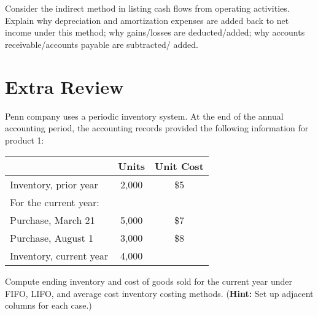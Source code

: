 \documentclass{scrartcl}
\begin{document}
\vspace{10em}

Consider the indirect method in listing cash flows from operating
activities. Explain why depreciation and amortization expenses are 
added back to net income under this method; why gains/losses are
deducted/added; why accounts receivable/accounts payable are subtracted/%
added.

\vspace{10em}

\section{Extra Review}

Penn company uses a periodic inventory system. 
At the end of the annual accounting period,
the accounting records provided the following information for product 1:

\begin{center}
\begin{tabular}{|lcc|} \hline
     & Units & Unit Cost \\ \hline
    Inventory, prior year & 2,000 & \$5 \\
    For the current year: & & \\ 
    \hspace{1.5em} Purchase, March 21 & 5,000 & \$7 \\ 
    \hspace{1.5em} Purchase, August 1 & 3,000 & \$8 \\
    Inventory, current year & 4,000 & \\ \hline
    
\end{tabular}
\end{center}

Compute ending inventory and cost of goods sold for the current year
under FIFO, LIFO, and average cost inventory costing methods.
(\textbf{Hint:} Set up adjacent columns for each case.)

\vspace{10em}
\end{document}
